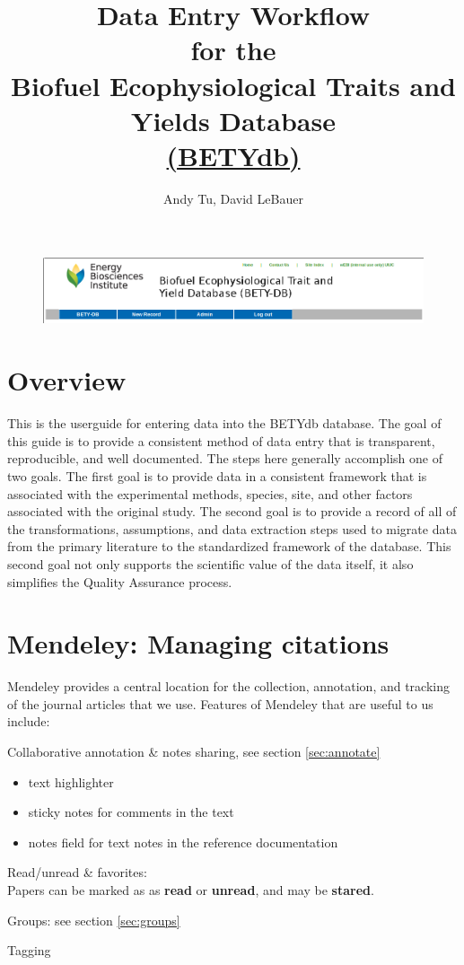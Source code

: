 \documentclass[12pt,english,portrait]{article}
\title{Data Entry Workflow\\for the \\Biofuel Ecophysiological Traits and Yields Database\\ \href{http://ebi-forecast.igb.uiuc.edu/bety/}{(BETYdb)}}
\author{Andy Tu, David LeBauer}
\begin{document}
\maketitle
\newpage

\listoffigures
\listoftables

\newpage

\begin{figure}
  \includegraphics[width=6.5in]{figures/db_header.png} 
\end{figure}

\section{Overview}
This is the userguide for entering data into the BETYdb database. 
The goal of this guide is to provide a consistent method of data entry that is transparent, reproducible, and well documented.
The steps here generally accomplish one of two goals. 
The first goal is to provide data in a consistent framework that is associated with the experimental methods, species, site, and other factors associated with the original study.
The second goal is to provide a record of all of the transformations, assumptions, and data extraction steps used to migrate data from the primary literature to the standardized framework of the database.
This second goal not only supports the scientific value of the data itself, it also simplifies the Quality Assurance process. 

\section{Mendeley: Managing citations}
Mendeley provides a central location for the collection, annotation, and tracking of the journal articles that we use.
Features of Mendeley that are useful to us include:
\begin{itemize*}
\item Collaborative annotation \& notes sharing, see section \ref{sec:annotate}
  \begin{itemize}
  \item text highlighter
  \item sticky notes for comments in the text
  \item notes field for text notes in the reference documentation
  \end{itemize} 
\item Read/unread \& favorites:  \\ Papers can be marked as as \textbf{read} or \textbf{unread}, and may be \textbf{stared}.
\item Groups: see section \ref{sec:groups}
\item Tagging
\end{itemize*}
\end{document}
